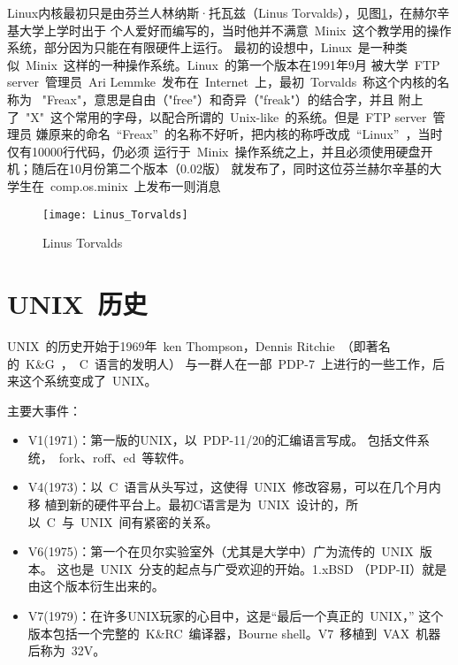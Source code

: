 Linux内核最初只是由芬兰人林纳斯·托瓦兹（Linus
Torvalds），见图\ref{fig:linus}，在赫尔辛基大学上学时出于
个人爱好而编写的，当时他并不满意~Minix~这个教学用的操作系统，部分因为只能在有限硬件上运行。
最初的设想中，Linux~是一种类似~Minix~这样的一种操作系统。Linux~的第一个版本在1991年9月
被大学~FTP server~管理员~Ari Lemmke~发布在~Internet~上，最初~Torvalds~称这个内核的名称为
~"Freax"，意思是自由（"free"）和奇异（"freak"）的结合字，并且
附上了~"X"~这个常用的字母，以配合所谓的~Unix-like~的系统。但是~FTP server~管理员
嫌原来的命名~“Freax”~的名称不好听，把内核的称呼改成~“Linux”~，当时仅有10000行代码，仍必须
运行于~Minix~操作系统之上，并且必须使用硬盘开机；随后在10月份第二个版本（0.02版）
就发布了，同时这位芬兰赫尔辛基的大学生在~comp.os.minix~上发布一则消息\par
\begin{center}
\end{center}
\begin{figure}[htbp]
    \centering
    \texttt{[image: Linus\_Torvalds]}
    \caption{Linus Torvalds}
    \label{fig:linus}
\end{figure}

\section{UNIX~历史}
\label{sec:history}
UNIX~的历史开始于1969年~ken Thompson，Dennis Ritchie~（即著名的~K\&G~，~C~语言的发明人）
与一群人在一部~PDP-7~上进行的一些工作，后来这个系统变成了~UNIX。\par
主要大事件：
\begin{itemize}
    \item V1(1971)：第一版的UNIX，以~PDP-11/20的汇编语言写成。
        包括文件系统，~fork、roff、ed~等软件。
    \item V4(1973)：以~C~语言从头写过，这使得~UNIX~修改容易，可以在几个月内移
        植到新的硬件平台上。最初C语言是为~UNIX~设计的，所以~C~与~UNIX~间有紧密的关系。
    \item V6(1975)：第一个在贝尔实验室外（尤其是大学中）广为流传的~UNIX~版本。
        这也是~UNIX~分支的起点与广受欢迎的开始。1.xBSD （PDP-II）就是由这个版本衍生出来的。
    \item V7(1979)：在许多UNIX玩家的心目中，这是“最后一个真正的~UNIX，”
        这个版本包括一个完整的~K\&RC~编译器，Bourne
        shell。V7~移植到~VAX~机器后称为~32V。
\end{itemize}
